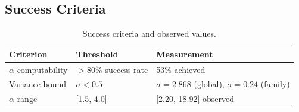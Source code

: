 \subsection{Success Criteria}

\begin{table}[h]
\centering
\begin{tabular}{@{}lll@{}}
\toprule
Criterion & Threshold & Measurement \\
\midrule
$\alpha$ computability & $>$80\% success rate & 53\% achieved \\
Variance bound & $\sigma < 0.5$ & $\sigma = 2.868$ (global), $\sigma = 0.24$ (family) \\
$\alpha$ range & [1.5, 4.0] & [2.20, 18.92] observed \\
\bottomrule
\end{tabular}
\caption{Success criteria and observed values.}
\label{tab:criteria}
\end{table}
